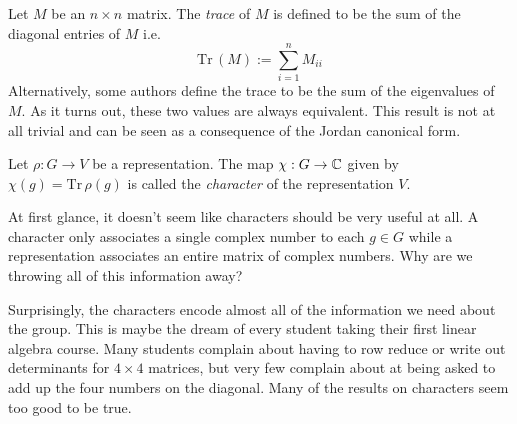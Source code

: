 




\def\Tr{\text{Tr}\,}

\begin{definition}
    Let $M$ be an $n \times n$ matrix. The \emph{trace} of $M$ is defined to be the sum of the diagonal entries of 
    $M$ i.e.
    \[
        \Tr(M) := \sum_{i=1}^n M_{ii}
    \]
    Alternatively, some authors define the trace to be the sum of the eigenvalues of $M$. As it turns out, these 
    two values are always equivalent. This result is not at all trivial and can be seen as a consequence of the 
    Jordan canonical form.
\end{definition}

\begin{definition}
    Let $\rho : G \rightarrow V$ be a representation. The map $\chi : G \rightarrow \mathbb{C}$ given by $\chi(g) = 
    \text{Tr}\,\rho(g)$ is called the \emph{character} of the representation $V$.
\end{definition}

At first glance, it doesn't seem like characters should be very useful at all. A character only associates a single 
complex number to each $g \in G$ while a representation associates an entire matrix of complex numbers. Why are we 
throwing all of this information away?

Surprisingly, the characters encode almost all of the information we need about the group. This is maybe the dream 
of every student taking their first linear algebra course. Many students complain about having to row reduce or 
write out determinants for $4 \times 4$ matrices, but very few complain about at being asked to add up the four 
numbers on the diagonal.  Many of the results on characters seem too good to be true.

